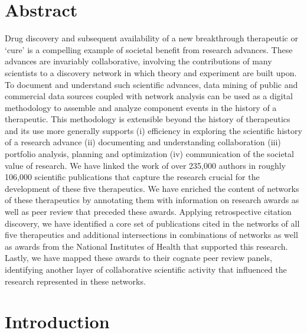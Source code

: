 \documentclass[10pt,letterpaper]{article}
\begin{document}
\section*{Abstract}

Drug discovery and subsequent availability of a new breakthrough therapeutic or `cure' is a compelling example of societal benefit from research advances. These advances are invariably collaborative, involving the contributions of many scientists to a discovery network in which theory and experiment are built upon. To document and understand such scientific advances, data mining of public and commercial data sources coupled with network analysis can be used as a digital methodology to assemble and analyze component events in the history of a therapeutic. This methodology is extensible beyond the history of therapeutics and its use more generally supports (i) efficiency in  exploring  the scientific history of a research advance (ii) documenting and understanding collaboration (iii) portfolio analysis, planning and optimization (iv) communication of the societal value of research. We have linked the work of over 235,000 authors in roughly 106,000 scientific publications that capture the research crucial for the development of these five therapeutics. We have enriched the content of networks of these therapeutics by annotating them with information on research awards as well as peer review that preceded these awards. Applying retrospective citation discovery, we have identified a core set of publications cited in the networks of all five therapeutics and additional intersections in combinations of networks as well as awards from the National Institutes of Health that supported this research. Lastly, we have mapped these awards to their cognate peer review panels, identifying another layer of collaborative scientific activity that influenced the research represented in these networks. 

\linenumbers

\section*{Introduction}
\end{document}
